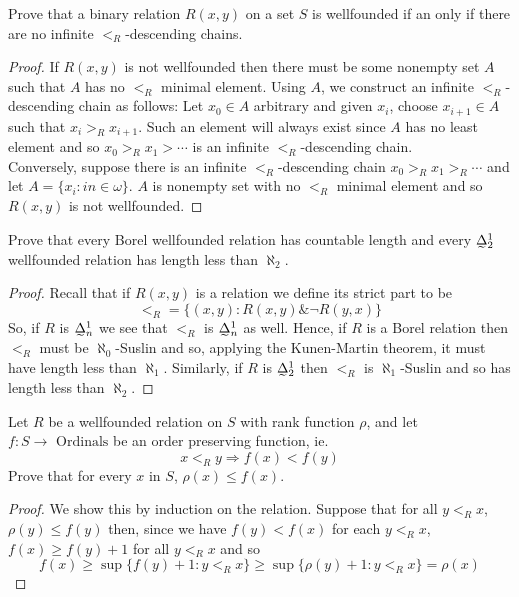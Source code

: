 
\begin{exercise}
    Prove that a binary relation $R(x,y)$ on a set $S$ is wellfounded if an only if there are no infinite $<_R$-descending chains. 
\end{exercise}

\begin{proof}
    If $R(x,y)$ is not wellfounded then there must be some nonempty set $A$ such that $A$ has no $<_R$ minimal element. Using $A$, we construct an infinite $<_R$-descending chain as follows: Let $x_0 \in A$ arbitrary and given $x_i$, choose $x_{i+1} \in A$ such that $x_i >_R x_{i+1}$. Such an element will always exist since $A$ has no least element and so $x_0 >_R x_1 > \cdots$ is an infinite $<_R$-descending chain. \\ 
    Conversely, suppose there is an infinite $<_{R}$-descending chain $x_0 >_R x_1 >_R \cdots$ and let $A = \{x_i \colon in \in \omega\}$. $A$ is nonempty set with no $<_R$ minimal element and so $R(x,y)$ is not wellfounded. 
\end{proof}

\begin{exercise}
    Prove that every Borel wellfounded relation has countable length and every $\undertilde{\Delta}^1_2$ wellfounded relation has length less than $\aleph_2$. 
\end{exercise}

\begin{proof}
    Recall that if $R(x,y)$ is a relation we define its strict part to be 
    \[ <_R = \{(x,y) \colon R(x,y) \& \neg R(y,x)\} \] 
    So, if $R$ is $\undertilde{\Delta}^1_n$ we see that $<_R$ is $\undertilde{\Delta}^1_n$ as well. Hence, if $R$ is a Borel relation then $<_R$ must be $\aleph_0$-Suslin and so, applying the Kunen-Martin theorem, it must have length less than $\aleph_1$. Similarly, if $R$ is $\undertilde{\Delta}_2^1$ then $<_R$ is $\aleph_1$-Suslin and so has length less than $\aleph_2$.
\end{proof}

\begin{exercise}
    Let $R$ be a wellfounded relation on $S$ with rank function $\rho$, and let $f: S \to \text{ Ordinals}$ be an order preserving function, ie. 
    \[ x<_Ry \Rightarrow f(x) < f(y) \]
    Prove that for every $x$ in $S$, $\rho(x) \le f(x)$. 
\end{exercise}

\begin{proof}
    We show this by induction on the relation. Suppose that for all $y <_R x$, $\rho(y) \le f(y)$ then, since we have $f(y) < f(x)$ for each $y <_R x$, $f(x) \ge f(y) +1$ for all $y <_R x$ and so 
    \[ f(x) \ge \sup\{ f(y)+1 \colon y <_R x\} \ge \sup\{\rho(y)+1 \colon y <_R x\} = \rho(x)\] 
\end{proof}

